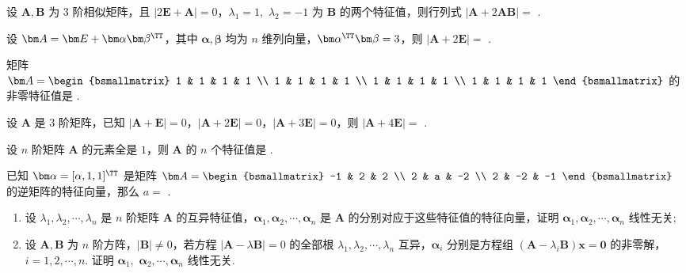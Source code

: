 	\begin{titwo}
		设 $\bm A, \bm B$ 为 $3$ 阶相似矩阵，且 $|2 \bm E + \bm A| = 0$，$\lambda_{1} = 1,$ $\lambda_{2} = -1$ 为 $\bm B$ 的两个特征值，则行列式 $|\bm A + 2 \bm A \bm B| = $ \htwo.
	\end{titwo}

	\begin{titwo}
		设 $\bm A = \bm E + \bm \alpha \bm \beta^{\TT}$，其中 $\bm \alpha, \bm \beta$ 均为 $n$ 维列向量，$\bm \alpha^{\TT}  \bm \beta = 3$，则 $|\bm A + 2 \bm E| = $ \htwo.
	\end{titwo}

	\begin{titwo}
		矩阵 $\bm A = \begin{bsmallmatrix}
			1 & 1 & 1 & 1 \\
			1 & 1 & 1 & 1 \\
			1 & 1 & 1 & 1 \\
			1 & 1 & 1 & 1
		\end{bsmallmatrix}$ 的非零特征值是 \htwo.
	\end{titwo}

	\begin{titwo}
		设 $\bm A$ 是 $3$ 阶矩阵，已知 $|\bm A + \bm E| = 0$，$|\bm A + 2 \bm E| = 0$，$|\bm A + 3 \bm E| = 0$，则 $|\bm A + 4 \bm E| = $ \htwo.
	\end{titwo}

	\begin{titwo}
		设 $n$ 阶矩阵 $\bm A$ 的元素全是 $1$，则 $\bm A$ 的 $n$ 个特征值是 \htwo.
	\end{titwo}

	\begin{titwo}
		已知 $\bm \alpha = [\alpha,1,1]^{\TT}$ 是矩阵 $\bm A = \begin{bsmallmatrix}
			-1 & 2 & 2 \\
			2 & a & -2 \\
			2 & -2 & -1
		\end{bsmallmatrix}$ 的逆矩阵的特征向量，那么 $a = $ \htwo.
	\end{titwo}

	\begin{titwo}
		\begin{enumerate}
			\item 设 $\lambda_{1},\lambda_{2},\cdots,\lambda_{n}$ 是 $n$ 阶矩阵 $\bm A$ 的互异特征值，$\bm \alpha_{1},\bm \alpha_{2},\cdots,\bm \alpha_{n}$ 是 $\bm A$ 的分别对应于这些特征值的特征向量，证明 $\bm \alpha_{1},\bm \alpha_{2},\cdots,\bm \alpha_{n}$ 线性无关;
			\item 设 $\bm A, \bm B$ 为 $n$ 阶方阵，$|\bm B| \ne 0$，若方程 $|\bm A - \lambda \bm B| = 0$ 的全部根 $\lambda_{1},\lambda_{2},\cdots,\lambda_{n}$ 互异，$\bm \alpha_{i}$ 分别是方程组 $(\bm A - \lambda_{i} \bm B) \bm x = \bm 0$ 的非零解，$i = 1,2,\cdots,n$. 证明 $\bm \alpha_{1},$ $\bm \alpha_{2},\cdots,\bm \alpha_{n}$ 线性无关.
		\end{enumerate}
	\end{titwo}

